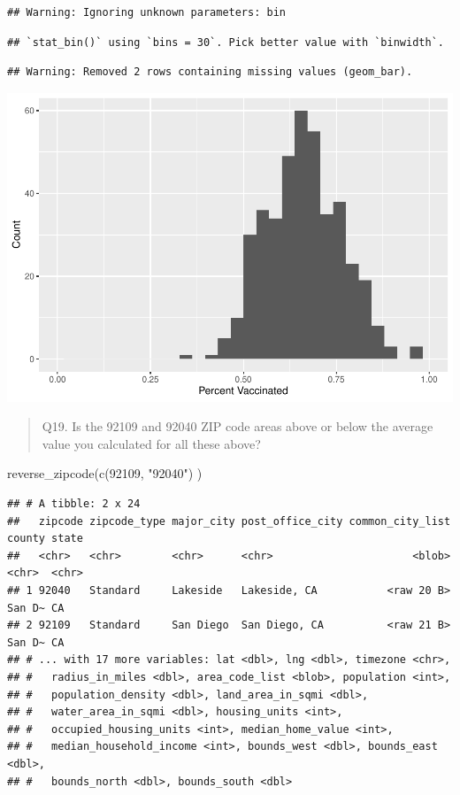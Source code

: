 \documentclass[
]{article}
\newenvironment{Shaded}{\begin{snugshade}}{\end{snugshade}}
\newcommand{\FunctionTok}[1]{\textcolor[rgb]{0.00,0.00,0.00}{#1}}
\newcommand{\NormalTok}[1]{#1}
\newcommand{\StringTok}[1]{\textcolor[rgb]{0.31,0.60,0.02}{#1}}
\begin{document}
\begin{verbatim}
## Warning: Ignoring unknown parameters: bin
\end{verbatim}

\begin{verbatim}
## `stat_bin()` using `bins = 30`. Pick better value with `binwidth`.
\end{verbatim}

\begin{verbatim}
## Warning: Removed 2 rows containing missing values (geom_bar).
\end{verbatim}

\includegraphics{Vaccine-rate-mini-project_files/figure-latex/unnamed-chunk-34-1.pdf}

\begin{quote}
Q19. Is the 92109 and 92040 ZIP code areas above or below the average
value you calculated for all these above?
\end{quote}

\begin{Shaded}
\begin{Highlighting}[]
\FunctionTok{reverse\_zipcode}\NormalTok{(}\FunctionTok{c}\NormalTok{(}\StringTok{\textquotesingle{}92109\textquotesingle{}}\NormalTok{, }\StringTok{"92040"}\NormalTok{) )}
\end{Highlighting}
\end{Shaded}

\begin{verbatim}
## # A tibble: 2 x 24
##   zipcode zipcode_type major_city post_office_city common_city_list county state
##   <chr>   <chr>        <chr>      <chr>                      <blob> <chr>  <chr>
## 1 92040   Standard     Lakeside   Lakeside, CA           <raw 20 B> San D~ CA   
## 2 92109   Standard     San Diego  San Diego, CA          <raw 21 B> San D~ CA   
## # ... with 17 more variables: lat <dbl>, lng <dbl>, timezone <chr>,
## #   radius_in_miles <dbl>, area_code_list <blob>, population <int>,
## #   population_density <dbl>, land_area_in_sqmi <dbl>,
## #   water_area_in_sqmi <dbl>, housing_units <int>,
## #   occupied_housing_units <int>, median_home_value <int>,
## #   median_household_income <int>, bounds_west <dbl>, bounds_east <dbl>,
## #   bounds_north <dbl>, bounds_south <dbl>
\end{verbatim}
\end{document}
